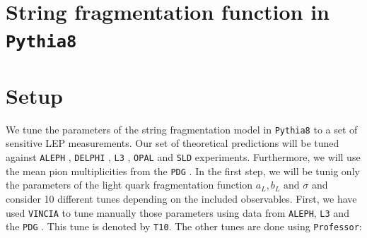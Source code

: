 \documentclass[aps,preprint,floatfix,nofootinbib,showpacs]{revtex4-1}
\begin{document}
\section{String fragmentation function in \texttt{Pythia8}} %
\label{Section2}

\section{Setup} %
\label{Section3}

We tune the parameters of the string fragmentation model 
in \texttt{Pythia8} to a set of sensitive LEP measurements. Our set
of theoretical predictions will be tuned against
\texttt{ALEPH} \cite{Decamp:1991uz, Buskulic:1994ft, Buskulic:1995au, Barate:1996fi, Heister:2001kp, Heister:2003aj},
\texttt{DELPHI} \cite{Abreu:1996na}, \texttt{L3} \cite{Adriani:1992hd, Achard:2004sv}, 
\texttt{OPAL} \cite{Akers:1994ez, Ackerstaff:1998ap, Ackerstaff:1998hz, Abbiendi:2004qz} and
\texttt{SLD} \cite{Abe:1998zs}
experiments. Furthermore, we will use the 
mean pion multiplicities from the \texttt{PDG} \cite{Amsler:2008zzb}.
In the first step, we will be tunig only the parameters of 
the light quark fragmentation function $a_L, b_L \text{ and } \sigma$ 
and consider 10 different tunes depending on the included observables. 
First, we have used \texttt{VINCIA} \cite{Giele:2007di} to tune manually those 
parameters using data from \texttt{ALEPH}, \texttt{L3}
and the \texttt{PDG} \cite{Achard:2004sv, Amsler:2008zzb}. This tune 
is denoted by \texttt{T10}. 
The other tunes are done using \texttt{Professor}:
\end{document}
